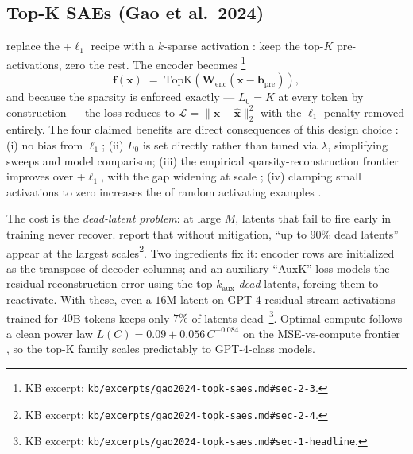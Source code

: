 \subsection{Top-K SAEs (Gao et al.\ 2024)}
\label{sec:sae-topk}

\citet{gao2024-topk-saes} replace the +$\ell_1$ recipe with a
$k$-sparse activation \citep[after][]{gao2024-topk-saes}: keep the
top-$K$ pre-activations, zero the rest. The encoder becomes
\citep[\S 2.3, Eq.~2]{gao2024-topk-saes}\footnote{KB excerpt:
\texttt{kb/excerpts/gao2024-topk-saes.md\#sec-2-3}.}
\begin{equation}
  \mathbf{f}(\mathbf{x}) \;=\; \mathrm{TopK}\!\left(\mathbf{W}_{\text{enc}}(\mathbf{x} - \mathbf{b}_{\text{pre}})\right),
  \label{eq:topk}
\end{equation}
and because the sparsity is enforced exactly --- $L_0 = K$ at every
token by construction --- the loss reduces to
$\mathcal{L} = \|\mathbf{x} - \hat{\mathbf{x}}\|_2^2$ with the $\ell_1$
penalty removed entirely. The four claimed benefits are direct
consequences of this design choice
\citep[\S 2.3]{gao2024-topk-saes}: (i) no  bias from $\ell_1$;
(ii) $L_0$ is set directly rather than tuned via $\lambda$, simplifying
sweeps and model comparison; (iii) the empirical sparsity-reconstruction
frontier improves over +$\ell_1$, with the gap widening at scale
\citep[Fig.~2b]{gao2024-topk-saes}; (iv) clamping small activations to
zero increases the  of random activating examples
\citep[\S 4.3]{gao2024-topk-saes}.

The cost is the \emph{dead-latent problem}: at large $M$, latents that
fail to fire early in training never recover. \citet{gao2024-topk-saes}
report that without mitigation, ``up to 90\% dead
latents''~\citep[\S 2.4]{gao2024-topk-saes} appear at the largest
scales\footnote{KB excerpt:
\texttt{kb/excerpts/gao2024-topk-saes.md\#sec-2-4}.}. Two ingredients
fix it: encoder rows are initialized as the transpose of decoder
columns; and an auxiliary ``AuxK'' loss models the residual
reconstruction error using the top-$k_{\text{aux}}$ \emph{dead}
latents, forcing them to reactivate. With these, even a
$16$M-latent  on GPT-4 residual-stream activations trained for $40$B
tokens keeps only $7\%$ of latents
dead~\citep[\S 1, \S 2.4]{gao2024-topk-saes}\footnote{KB excerpt:
\texttt{kb/excerpts/gao2024-topk-saes.md\#sec-1-headline}.}. Optimal
compute follows a clean power law $L(C) = 0.09 + 0.056\,C^{-0.084}$ on
the MSE-vs-compute frontier \citep[Fig.~1, \S 3]{gao2024-topk-saes}, so
the top-K family scales predictably to GPT-4-class models.

